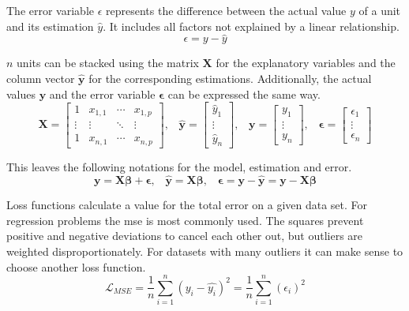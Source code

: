 The error variable $\epsilon$ represents the difference between the actual value $y$ of a unit and its estimation $\hat{y}$. It includes all factors not explained by a linear relationship. 
\begin{equation}
    \epsilon = y - \hat{y}
\end{equation}

$n$ units can be stacked using the matrix $\mathbf{X}$ for the explanatory variables and the column vector $\mathbf{\hat{y}}$ for the corresponding estimations. Additionally, the actual values $\mathbf{y}$ and the error variable $\boldsymbol{\epsilon}$ can be expressed the same way.
\begin{equation}
    \mathbf{X} = \begin{bmatrix}1&x_{1,1}&\cdots &x_{1,p}\\\vdots&\vdots&\ddots&\vdots\\1&x_{n,1}&\cdots &x_{n,p}\end{bmatrix}\text{,}\quad
    \mathbf{\hat{y}} = \begin{bmatrix}\hat{y}_1\\\vdots\\\hat{y}_n\end{bmatrix}\text{,}\quad
    \mathbf{y} = \begin{bmatrix}y_1\\\vdots\\y_n\end{bmatrix}\text{,}\quad
    \boldsymbol{\epsilon} = \begin{bmatrix}\epsilon_1\\\vdots\\\epsilon_n\end{bmatrix}
\end{equation}

This leaves the following notations for the model, estimation and error.
\begin{equation}
    \mathbf{y} = \mathbf{X}\boldsymbol{\beta} + \boldsymbol{\epsilon}\text{,}\quad
    \mathbf{\hat{y}} = \mathbf{X}\boldsymbol{\beta}\text{,}\quad
    \boldsymbol{\epsilon} = \mathbf{y} - \mathbf{\hat{y}} = \mathbf{y} - \mathbf{X}\boldsymbol{\beta}
\end{equation}

Loss functions calculate a value for the total error on a given data set. For regression problems the \gls{mse} is most commonly used. The squares prevent positive and negative deviations to cancel each other out, but outliers are weighted disproportionately. For datasets with many outliers it can make sense to choose another loss function. 
\begin{equation}
    \mathcal{L}_{MSE} = \frac{1}{n}\sum_{i=1}^{n} {(y_i - \hat{y_i})}^2 = \frac{1}{n}\sum_{i=1}^{n} {(\epsilon_i)}^2
\end{equation}


